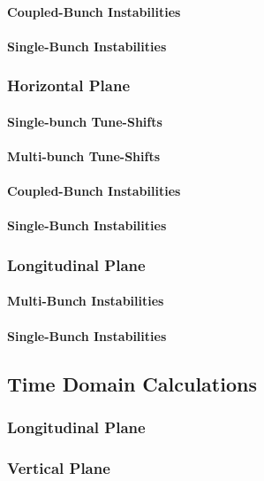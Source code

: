 \documentclass[
	12pt,				%
	openright,			%
	oneside,			%
	a4paper,		%
	chapter=TITLE,		%
	section=TITLE,		%
    brazil,				%
	english,			%
	sumario=tradicional,
	]{abntex2}
\begin{document}
        \paragraph{Coupled-Bunch Instabilities}
        \paragraph{Single-Bunch Instabilities}
      \subsubsection{Horizontal Plane}
        \paragraph{Single-bunch Tune-Shifts}
        \paragraph{Multi-bunch Tune-Shifts}
        \paragraph{Coupled-Bunch Instabilities}
        \paragraph{Single-Bunch Instabilities}
      \subsubsection{Longitudinal Plane}
        \paragraph{Multi-Bunch Instabilities}
        \paragraph{Single-Bunch Instabilities}
    \subsection{Time Domain Calculations}
      \subsubsection{Longitudinal Plane}
      \subsubsection{Vertical Plane}
\end{document}
